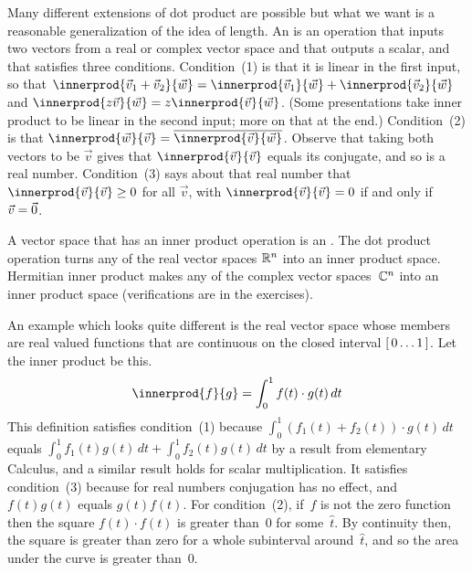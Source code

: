Many different extensions of dot product are possible but what we want is 
a reasonable generalization of the idea of length.
An  is an operation
that inputs two vectors from a real or complex vector space 
and that outputs a scalar, and that
satisfies three conditions.
Condition~(1) is that it is linear in the first input, so that
$\innerprod{\vec{v}_1+\vec{v}_2}{\vec{w}}
 = \innerprod{\vec{v}_1}{\vec{w}}
   +\innerprod{\vec{v}_2}{\vec{w}}$
and $\innerprod{z\vec{v}}{\vec{w}}
     =z\innerprod{\vec{v}}{\vec{w}}$.
(Some presentations take inner product 
to be linear in the second input; more on that
at the end.)
Condition~(2) is that
$\innerprod{\vec{w}}{\vec{v}}=\compconj{\innerprod{\vec{v}}{\vec{w}}}$.
Observe that taking both vectors to be 
$\vec{v}$ gives that $\innerprod{\vec{v}}{\vec{v}}$ equals its conjugate, and
so is a real number.
Condition~(3) says about that real number that
$\innerprod{\vec{v}}{\vec{v}}\geq 0$ for all $\vec{v}$, with 
$\innerprod{\vec{v}}{\vec{v}}= 0$ if and only if $\vec{v}=\vec{0}$.

A vector space that has an inner product operation is an
.
The dot product operation turns any of the real vector spaces $\mathbb{R}^n$ into
an inner product space. 
Hermitian inner product makes any of the complex vector spaces~$\mathbb{C}^n$ into 
an inner product space (verifications are in the exercises).

An example which looks quite different 
is the real vector space whose members are
real valued functions that are continuous on the 
closed interval $[\,0\ldots 1\,]$.
Let the inner product be this.
\begin{equation*}
  \innerprod{f}{g}=\int_{0}^1 f(t)\cdot g(t)\,dt
\end{equation*}
This definition satisfies
condition~(1) because  
$\int_{0}^1 (f_1(t)+f_2(t))\cdot g(t)\,dt$ equals 
$\int_{0}^1 f_1(t)g(t)\,dt+\int_{0}^1 f_2(t)g(t)\,dt$
by a result from elementary Calculus,
and a similar result holds for scalar multiplication. 
It satisfies condition~(3) because for real numbers conjugation has no effect,
and $f(t)g(t)$ equals $g(t)f(t)$. 
For condition~(2), if~$f$ is not the zero function then 
the square $f(t)\cdot f(t)$ is greater than~$0$ for some~$\hat{t}$.
By continuity then, the square is greater than zero for a whole subinterval
around~$\hat{t}$,
and so the area under the curve is greater than~$0$.

